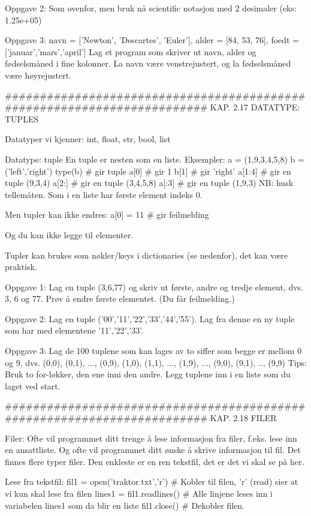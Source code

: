 Oppgave 2: Som ovenfor, men bruk nå scientific notasjon med 2 desimaler (eks: 1.25e+05)

Oppgave 3: navn = ['Newton', 'Descartes', 'Euler'], alder = [84, 53, 76], 
foedt = ['januar','mars','april']
Lag et program som skriver ut navn, alder og fødselsmåned i fine kolonner.
La navn være venstrejustert, og la fødselsmåned være høyrejustert.

######################################################################## 
KAP. 2.17  DATATYPE: TUPLES 

Datatyper vi kjenner: int, float, str, bool, list 

Datatype: tuple
En tuple er nesten som en liste.
Eksempler: 
a = (1,9,3,4,5,8)
b = ('left','right')
type(b)    # gir tuple
a[0]       # gir 1 
b[1]       # gir 'right'
a[1:4]     # gir en tuple (9,3,4)
a[2:]      # gir en tuple (3,4,5,8)
a[:3]      # gir en tuple (1,9,3)
NB: husk tellemåten. Som i en liste har første element indeks 0. 

Men tupler kan ikke endres:
a[0] = 11  # gir feilmelding

Og du kan ikke legge til elementer. 

Tupler kan brukes som nøkler/keys i dictionaries (se nedenfor), det kan være praktisk. 



Oppgave 1: Lag en tuple (3,6,77) og skriv ut første, andre og tredje element, dvs. 3, 6 og 77.
Prøv å endre første elementet. (Du får feilmelding.) 


Oppgave 2: Lag en tuple ('00','11','22','33','44','55'). 
Lag fra denne en ny tuple som har med elementene '11','22','33'. 


Oppgave 3: Lag de 100 tuplene som kan lages av to siffer som begge er mellom 0 og 9,
dvs. (0,0), (0,1), ..., (0,9), (1,0), (1,1), ..., (1,9), ..., (9,0), (9,1), .., (9,9)
Tips: Bruk to for-løkker, den ene inni den andre. 
Legg tuplene inn i en liste som du laget ved start.

######################################################################## 
KAP. 2.18  FILER 

Filer:
Ofte vil programmet ditt trenge å lese informasjon fra filer, 
f.eks. lese inn en ansattliste.
Og ofte vil programmet ditt ønske å skrive informasjon til fil. 
Det finnes flere typer filer. 
Den enkleste er en ren tekstfil, det er det vi skal se på her. 

Lese fra tekstfil:
fil1 = open('traktor.txt','r')    # Kobler til filen, 'r' (read) sier at vi kun skal lese fra filen
lines1 = fil1.readlines()         # Alle linjene leses inn i variabelen lines1 som da blir en liste
fil1.close()                      # Dekobler filen. 

